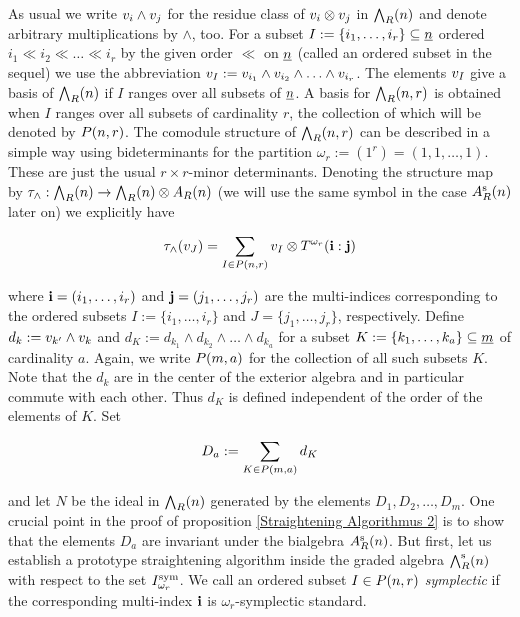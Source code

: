 \documentclass[twoside,12pt]{article}
\begin{document}
As usual we write $v_{i}\wedge v_{j}$ for the residue class of $v_{i}\otimes v_{j}$ in ${\bigwedge}_{R}(n)$ and denote arbitrary multiplications by
$\wedge$, too. For a subset $I:=\{i_1, \ldots , i_r\}\subseteq \underline{n}$
ordered $i_1 \ll i_2 \ll \ldots \ll i_r$ by the given order
$\ll$ on $\underline{n}$ (called an ordered subset in the sequel)
we use the abbreviation $v_{I}:=v_{i_1}\wedge v_{i_2}\wedge\ldots\wedge
v_{i_r}$. The elements $v_{I}$ give a basis of ${\bigwedge}_{R}(n)$ if $I$ ranges over all
subsets of $\underline{n}$. A basis for ${\bigwedge}_{R}(n,r)$ is obtained when $I$ ranges over all
subsets of cardinality $r$, the collection of which will be denoted by
$P({n},{r})$. The comodule structure of ${\bigwedge}_{R}(n,r)$ 
can be described in a
simple way using bideterminants for the partition
$\omega_r:=(1^r)=(1,1,\ldots ,1)$. These are just the usual $r\times
r$-minor determinants.
Denoting the structure map by
$\tau_{\wedge}:{\bigwedge}_{R}(n)\rightarrow {\bigwedge}_{R}(n)\otimes A_{R}(n)$ (we will use the same symbol in
the case $A^{{\rm s}}_{R}(n)$ later on) we explicitly have

\begin{equation}\label{aA comodul}
 \tau_{\wedge}(v_{J})=\sum_{I \in P({n},{r})}v_{I}\otimes T^{\omega_r}({\bf i}:{\bf j})
\end{equation}

where ${\bf i}=(i_1, \ldots , i_r)$ and ${\bf j}=(j_1, \ldots , j_r)$ 
are the multi-indices corresponding to the
ordered subsets $I:=\{i_1, \ldots , i_r\}$ and $J=\{j_1, \ldots , j_r\}$, 
respectively.
Define $d_k:=v_{k'} \wedge v_{k}$ and
$d_K:=d_{k_1}\wedge d_{k_2} \wedge \ldots \wedge d_{k_a}$ for a
subset $K:=\{k_1, \ldots, k_a\}\subseteq\underline{m}$ of cardinality $a$.
Again, we write $P({m},{a})$ for the collection of all such subsets $K$.
Note that the $d_k$ are in the center of the exterior algebra and in particular
commute with each other. Thus $d_K$ is defined
independent of the order of the elements of $K$. Set

\[ D_a:=\sum_{K\in P({m},{a})} d_K \]

and let $N$ be the ideal in ${\bigwedge}_{R}(n)$ generated by the elements
$D_1, D_2, \ldots , D_m$. One crucial point in the proof of
proposition \ref{Straightening Algorithmus 2} is to show that
the elements $D_a$ are invariant under the bialgebra $A^{{\rm s}}_{R}(n)$.
But first, let us establish a prototype straightening algorithm inside
the graded algebra ${\bigwedge}^{\rm s}_{R}(n)$ with respect to the set 
$I_{\omega_r}^{\rm sym}$. We call an ordered subset $I\in P({n},{r})$ {\em
  symplectic} if the corresponding multi-index ${\bf i}$ is
$\omega_r$-symplectic standard.
\end{document}
